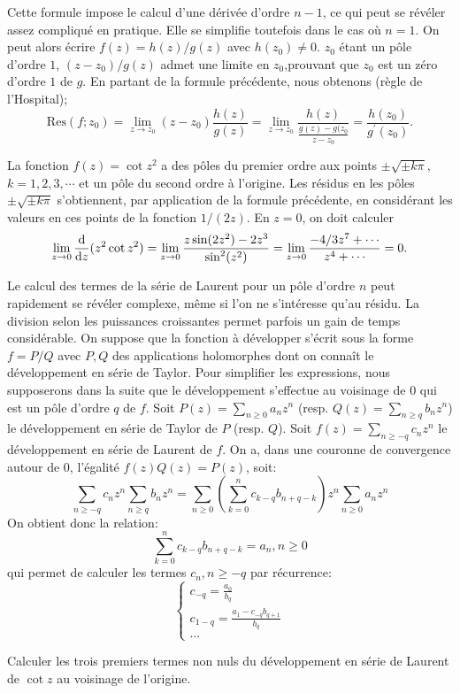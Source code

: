 Cette formule impose le calcul d'une dérivée d'ordre $n-1$,  ce qui peut se révéler assez compliqué en pratique. Elle se simplifie toutefois dans le cas où $n=1$. On peut alors écrire $f(z)=h(z)/g(z)$ avec $h(z_0) \neq 0$. $z_0$ étant un pôle d'ordre $1$, $(z-z_0)/g(z)$ admet une limite en $z_0$,prouvant que $z_0$ est un zéro d'ordre $1$ de $g$. En partant de la formule précédente, nous obtenons (règle de l'Hospital);
\[\text{Res}(f;z_0) = \lim_{z \to z_0} (z-z_0) \frac{h(z)}{g(z)}=\lim_{z \to z_0} \frac{h(z)}{\frac{g(z)-g(z_0}{z-z_0}} = \frac{h(z_0)}{g^\prime(z_0)}.\]

\begin{exem}
La fonction $f(z)=\cot z^2$ a des pôles du premier ordre aux points $\pm \sqrt{\pm k \pi}$, $k=1,2,3,\cdots$ et un pôle du second ordre à l'origine. Les résidus en les pôles $\pm \sqrt{\pm k \pi}$ s'obtiennent, par application de la formule précédente, en considérant les valeurs en ces points de la fonction $1/(2z)$. En $z=0$, on doit calculer
\[\lim_{z \to 0} \frac{\mathop{}\mathopen{}\mathrm{d}}{\mathop{}\mathopen{}\mathrm{d} z}(z^2 \cot z^2) = \lim_{z \to 0} \frac{z \sin(2 z^2)-2 z^3}{\sin^2(z^2)} =  \lim_{z \to 0} \frac{-4/3 z^7 + \cdots}{z^4 + \cdots}=0.\]
\end{exem}
Le calcul des termes de la série de Laurent pour un pôle d'ordre $n$ peut rapidement se révéler complexe, même si l'on ne s'intéresse qu'au résidu. La division selon les puissances croissantes permet parfois un gain de temps considérable. On suppose que la fonction à développer s'écrit sous la forme $f = P/Q$ avec $P,Q$ des applications holomorphes dont on connaît le développement en série de Taylor. Pour simplifier les expressions, nous supposerons dans la suite que le développement s'effectue au voisinage de $0$ qui est un pôle d'ordre $q$ de $f$. 
Soit $P(z) = \sum_{n \geq 0} a_n z^n$ (resp.
$Q(z) = \sum_{n \geq q} b_n z^n$) le développement en série de Taylor de $P$ (resp. $Q$). Soit 
$f(z) = \sum_{n \geq -q} c_n z^n$ le développement en
série de Laurent de $f$. On a, dans une couronne de 
convergence autour de $0$, l'égalité $f(z)Q(z)=P(z)$,
soit:
\[
\sum_{n \geq -q} c_n z^n \sum_{n \geq q} b_n z^n  = 
\sum_{n \geq 0} \left(\sum_{k=0}^n c_{k-q}b_{n+q-k}\right ) z^n
\sum_{n \geq 0} a_n z^n
\]
On obtient donc la relation:
\[
\sum_{k=0}^n c_{k-q}b_{n+q-k} = a_n, n\geq 0
\]
qui permet de calculer les termes $c_n, n \geq -q$ par récurrence:
\[
\begin{cases}
c_{-q} = \frac{a_0}{b_q} \\
c_{1-q}= \frac{a_1-c_{-q}b_{q+1}}{b_q} \\
\dots
\end{cases}
\]
\begin{exercice}
    Calculer les trois premiers termes non nuls du développement en série de Laurent de $\cot z$ au voisinage de l'origine.
\end{exercice}
